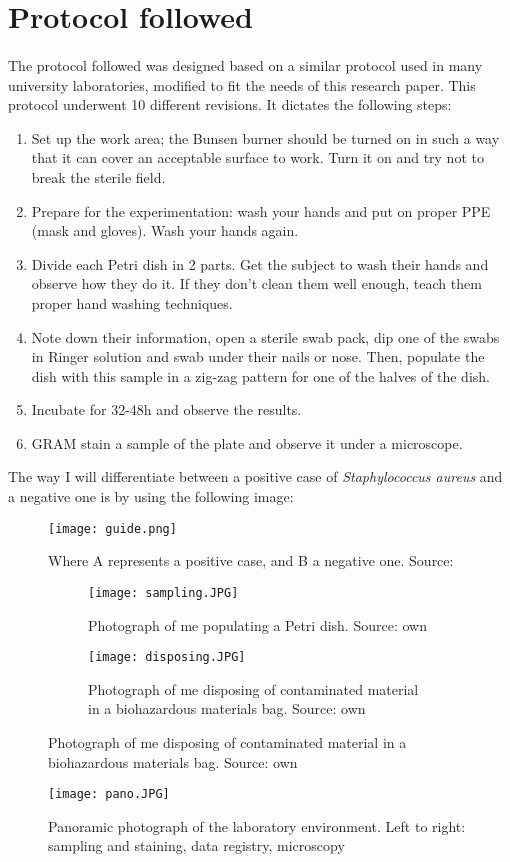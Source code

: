 \section{Protocol followed}
\paragraph{}The protocol followed was designed based on a similar protocol used in many university laboratories\cite{olearyPracticalHandbookMicrobiology1989}, modified to fit the needs of this research paper. This protocol underwent 10 different revisions. It dictates the following steps: \newline
\begin{enumerate}[label=\arabic*)]
\item Set up the work area; the Bunsen burner should be turned on in such a way that it can cover an acceptable surface to work. Turn it on and try not to break the sterile field.
\item Prepare for the experimentation: wash your hands and put on proper PPE (mask and gloves). Wash your hands again.
\item Divide each Petri dish in 2 parts. Get the subject to wash their hands and observe how they do it. If they don't clean them well enough, teach them proper hand washing techniques.
\item Note down their information, open a sterile swab pack, dip one of the swabs in Ringer solution and swab under their nails or nose. Then, populate the dish with this sample in a zig-zag pattern for one of the halves of the dish.
\item Incubate for 32-48h and observe the results.
\item GRAM stain a sample of the plate and observe it under a microscope.
\end{enumerate}
The way I will differentiate between a positive case of \emph{Staphylococcus aureus} and a negative one is by using the following image:
\begin{center}\begin{figure}[H]\centering\texttt{[image: guide.png]}\caption{Where A represents a positive case, and B a negative one. Source:\cite{nakuleshwardutjasujaFigureStaphylococcusAureus}}\end{figure}\end{center}
\begin{figure}[h!] \centering \begin{subfigure}[b]{0.4\linewidth} \texttt{[image: sampling.JPG]} \caption{Photograph of me populating a Petri dish. Source: own} \end{subfigure} \begin{subfigure}[b]{0.4\linewidth} \texttt{[image: disposing.JPG]} \caption{Photograph of me disposing of contaminated material in a biohazardous materials bag. Source: own} \end{subfigure}\label{fig:coffee}\end{figure}
\begin{center}\begin{figure}[H]\centering\texttt{[image: pano.JPG]}\caption{Panoramic photograph of the laboratory environment. Left to right: sampling and staining, data registry, microscopy}\end{figure}\end{center}
\newpage